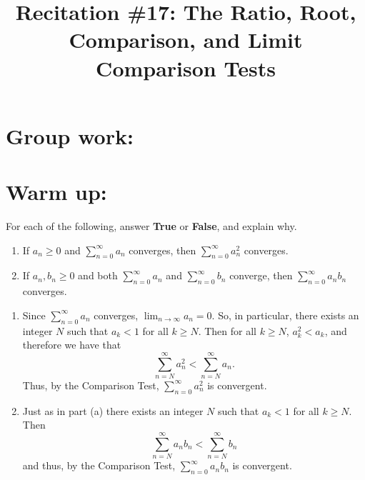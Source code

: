 \documentclass[noinstructornotes]{ximera}
\title{Recitation \#17: The Ratio, Root, Comparison, and Limit Comparison Tests}
\begin{document}
\begin{abstract}		\end{abstract}
\maketitle












\section{Group work:}

\section{Warm up:}
For each of the following, answer {\bf True} or {\bf False}, and explain why.
	\begin{enumerate}
	
	\item  If $a_n \geq 0$ and $\sum_{n=0}^\infty a_n$ converges, then $\sum_{n=0}^\infty a_n^2$ converges.
	
	\item  If $a_n, b_n \geq 0$ and both $\sum_{n=0}^\infty a_n$ and $\sum_{n=0}^\infty b_n$ converge, then $\sum_{n=0}^\infty a_n b_n$ converges. 
	
	\end{enumerate}
	
	\begin{freeResponse}
		\begin{enumerate}
		
		\item  {}
		
		Since $\sum_{n=0}^\infty a_n$ converges, $\lim_{n \to \infty} a_n = 0$.  
		So, in particular, there exists an integer $N$ such that $a_k < 1$ for all $k \geq N$.  
		Then for all $k \geq N$, $a_k^2 < a_k$, and therefore we have that
			\[
			\sum_{n=N}^\infty a_n^2 < \sum_{n=N}^\infty a_n.
			\]
		Thus,  by the Comparison Test, $\sum_{n=0}^\infty a_n^2$ is convergent.
		
		
		
		\item  {}
		
		Just as in part (a) there exists an integer $N$ such that $a_k < 1$ for all $k \geq N$.  
		Then
			\[
			\sum_{n=N}^\infty a_n b_n < \sum_{n=N}^\infty b_n
			\]
		and thus, by the Comparison Test, $\sum_{n=0}^\infty a_n b_n$ is convergent.
		
		\end{enumerate}
	\end{freeResponse}
	
\end{document}
